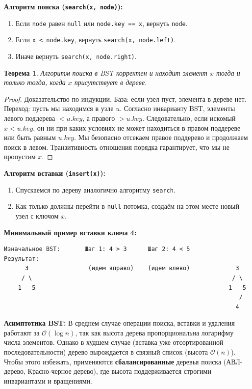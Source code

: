 \documentclass[12pt,a4paper]{article}
\newtheorem{theorem}{Теорема}
\begin{document}
\textbf{Алгоритм поиска (\texttt{search(x, node)}):}
\begin{enumerate}
    \item Если \texttt{node} равен \texttt{null} или \texttt{node.key == x}, вернуть \texttt{node}.
    \item Если \texttt{x < node.key}, вернуть \texttt{search(x, node.left)}.
    \item Иначе вернуть \texttt{search(x, node.right)}.
\end{enumerate}

\begin{theorem}
Алгоритм поиска в BST корректен и находит элемент $x$ тогда и только тогда, когда $x$ присутствует в дереве.
\end{theorem}
\begin{proof}
Доказательство по индукции. База: если узел пуст, элемента в дереве нет.
Переход: пусть мы находимся в узле $u$. Согласно инварианту BST, элементы левого поддерева $< u.key$, а правого $> u.key$. Следовательно, если искомый $x < u.key$, он ни при каких условиях не может находиться в правом поддереве или быть равным $u.key$. Мы безопасно отсекаем правое поддерево и продолжаем поиск в левом. Транзитивность отношения порядка гарантирует, что мы не пропустим $x$.
\end{proof}

\textbf{Алгоритм вставки (\texttt{insert(x)}):}
\begin{enumerate}
    \item Спускаемся по дереву аналогично алгоритму \texttt{search}.
    \item Как только должны перейти в \texttt{null}-потомка, создаём на этом месте новый узел с ключом $x$.
\end{enumerate}

\textbf{Минимальный пример вставки ключа 4:}
\begin{verbatim}
Изначальное BST:       Шаг 1: 4 > 3      Шаг 2: 4 < 5        Результат:
      3                 (идем вправо)    (идем влево)             3
     / \                                                         / \
    1   5                                                       1   5
                                                                   /
                                                                  4
\end{verbatim}

\textbf{Асимптотика BST:}
В среднем случае операции поиска, вставки и удаления работают за $\mathcal{O}(\log n)$, так как высота дерева пропорциональна логарифму числа элементов.
Однако в худшем случае (вставка уже отсортированной последовательности) дерево вырождается в связный список (высота $\mathcal{O}(n)$). Чтобы этого избежать, применяются \textbf{сбалансированные} деревья поиска (АВЛ-дерево, Красно-черное дерево), где высота поддерживается строгими инвариантами и вращениями.
\end{document}
